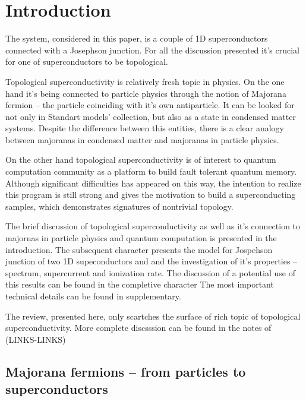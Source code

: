 \chapter{Introduction}


The system, considered in this paper, is a couple of 1D superconductors connected with a Josephson junction. For all the discussion presented it's crucial for one of superconductors to be topological. 

Topological superconductivity is relatively fresh topic in physics. On the one hand it's being connected to particle physics through the notion of Majorana fermion -- the particle coinciding with it's own antiparticle. It can be looked for not only in Standart models' collection, but also as a state in condensed matter systems. Despite the difference between this entities, there is a clear analogy between majoranas in condensed matter and majoranas in particle physics.

 On the other hand topological superconductivity is of interest to quantum computation community as a platform to build fault tolerant quantum memory. Although significant difficulties has appeared on this way, the intention to realize this program is still strong and gives the motivation to build a superconducting samples, which demonstrates signatures of nontrivial topology.

The brief discussion of topological superconductivity as well as it's connection to majornas in particle physics and quantum computation is presented in the introduction. The subsequent character presents the model for Jospehson junction of two 1D supeconductors  and and the investigation of it's properties -- spectrum, supercurrent and ionization rate. The discussion of a potential use of this results can be found in the	completive character The most important technical details can be found in supplementary.

The review, presented here, only scartches the surface of rich topic of topological superconductivity. More complete discsssion can be found in the notes of (LINKS-LINKS)

\section{Majorana fermions -- from particles to superconductors}

